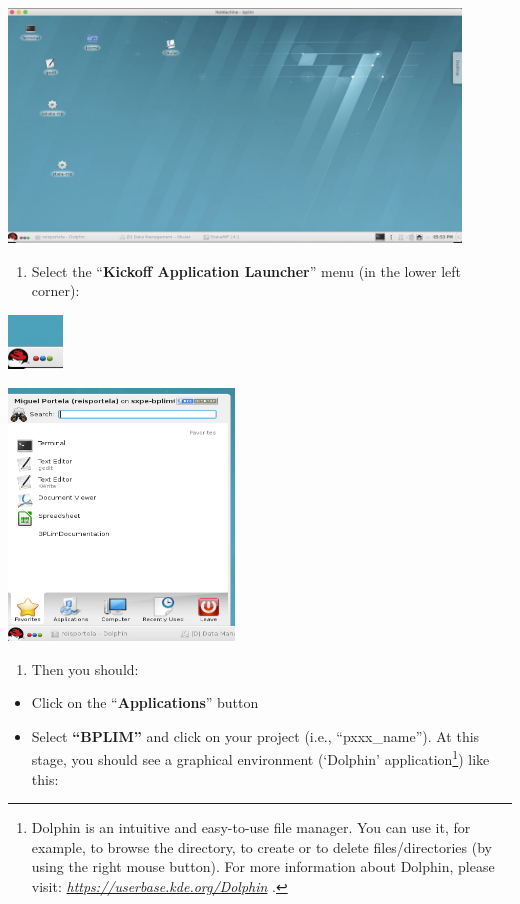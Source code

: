 \documentclass[]{book}
\providecommand{\tightlist}{%
  \setlength{\itemsep}{0pt}\setlength{\parskip}{0pt}}
\let\rmarkdownfootnote\footnote%
\def\footnote{\protect\rmarkdownfootnote}
\begin{document}
\includegraphics[width=4.72441in,height=2.44898in]{./media/image3.png}

\begin{enumerate}
\def\labelenumi{\arabic{enumi}.}
\setcounter{enumi}{3}
\tightlist
\item
  Select the ``\textbf{Kickoff Application Launcher}'' menu (in the lower left corner):
\end{enumerate}

\includegraphics[width=0.57067in,height=0.56371in]{./media/image4.png}

\includegraphics[width=2.3622in,height=2.63948in]{./media/image5.png}

\begin{enumerate}
\def\labelenumi{\arabic{enumi}.}
\setcounter{enumi}{4}
\tightlist
\item
  Then you should:
\end{enumerate}

\begin{itemize}
\tightlist
\item
  Click on the ``\textbf{Applications}'' button
\item
  Select \textbf{``BPLIM''} and click on your project (i.e., ``pxxx\_name''). At this stage, you should see a graphical environment (`Dolphin' application\footnote{Dolphin is an intuitive and easy-to-use file manager. You can use it, for example, to browse the directory, to
    create or to delete files/directories (by using the right mouse
    button). For more information about Dolphin, please visit:
    \href{https://translate.google.com/translate?hl=en\&prev=_t\&sl=pt-BR\&tl=en\&u=https://userbase.kde.org/Dolphin}{\emph{{https://userbase.kde.org/Dolphin}}}
    .}) like this:
\end{itemize}
\end{document}
